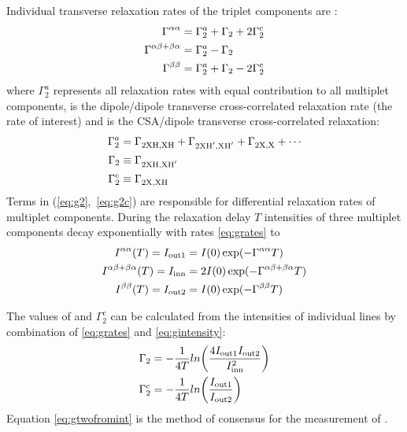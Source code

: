 \documentclass[twocolumn]{svjour3}           %
\begin{document}
Individual transverse relaxation rates of the triplet components are 
\cite{kumar_cross-correlations_2000,banci_side_2001,miclet_relaxation-optimized_2004}:
\begin{subequations}
\label{eq:grates} 
\begin{align}
\label{eq:gaa} 
  \textrm{\ensuremath{\Gamma}}^{\alpha\alpha}    & = \Gamma_2^a + \Gamma_2 + 2 \Gamma_2^c  \\
  \label{eq:gab} 
  \textrm{\ensuremath{\Gamma}}^{\alpha\beta + \beta\alpha}  & = \Gamma_2^a - \Gamma_2 \\
  \label{eq:gbb} 
  \textrm{\ensuremath{\Gamma}}^{\beta\beta}    & = \Gamma_2^a + \Gamma_2 - 2 \Gamma_2^c
\end{align}
\end{subequations}
where $\Gamma_2^a$ represents all relaxation rates with equal contribution 
to all  multiplet components, \gtwo{} is the dipole\slash dipole transverse 
cross-correlated relaxation rate (the rate of interest) and \gtwoCSA{} is 
the CSA\slash dipole transverse cross-correla\-ted relaxation:
\begin{subequations}
\label{eq:gcompounds} 
\begin{align}
 \label{eq:g2a} 
 \Gamma_2^a & = \Gamma_\text{2{X\ensuremath{\text{H}},X\ensuremath{\text{H}}}}^\text{} + 
               \Gamma_\text{2{X\ensuremath{\text{H}'},X\ensuremath{\text{H}'}}}^\text{} +
               \Gamma_\text{2{X,X}}^\text{} + \cdots \\
 \label{eq:g2} 
 \Gamma_2 & \equiv \Gamma_\text{2{X\ensuremath{\text{H}},X\ensuremath{\text{H}'}}}^\text{} \\
  \label{eq:g2c} 
 \Gamma_2^c & \equiv \Gamma_\text{2{X,X\ensuremath{\text{H}}}}^\text{} 
\end{align}
\end{subequations}
Terms in (\ref{eq:g2},~\ref{eq:g2c}) are responsible for
differential relaxation rates of multiplet components.
During the relaxation delay $T$ intensities of three
mul\-ti\-plet components decay exponentially 
with rates \eqref{eq:grates} to
\begin{subequations}
\label{eq:gintensity} 
\begin{align}
  \label{eq:gint:aa} 
    \textrm{\ensuremath{I}}^{\alpha\alpha}(T)    = I_\textrm{out1} & = I(0)\exp(-\textrm{\ensuremath{\Gamma}}^{\alpha\alpha} T) \\
  \label{eq:gint:abba} 
    \textrm{\ensuremath{I}}^{\alpha\beta + \beta\alpha}(T)  = I_\textrm{inn}  &  = 2 I(0)\exp(-\textrm{\ensuremath{\Gamma}}^{\alpha\beta + \beta\alpha} T) \\
  \label{eq:gint:bb} 
  \textrm{\ensuremath{I}}^{\beta\beta}(T)   = I_\textrm{out2} &= I(0)\exp(-\textrm{\ensuremath{\Gamma}}^{\beta\beta} T) 
\end{align}
\end{subequations}

The values of \gtwo{} and $\Gamma_2^c$ can be calculated from the intensities 
of individual lines by combination of 
\eqref{eq:grates} and \eqref{eq:gintensity}:
\begin{align}
\label{eq:gtwofromint}
  \Gamma_2 & = - \frac{1}{4T} ln\biggl(\frac{4 I_\textrm{out1} I_\textrm{out2}}{I_\textrm{inn}^2}\biggr)\\
\label{eq:gcsafromint}
  \Gamma_2^c & = - \frac{1}{4T} ln\biggl(\frac{I_\textrm{out1}}{I_\textrm{out2}}\biggr)
\end{align}
Equation \eqref{eq:gtwofromint} is the method of consensus for the measurement of 
\gtwo{}
\cite{yang_study_1998,banci_side_2001,zheng_measurement_2004}. 
\end{document}
